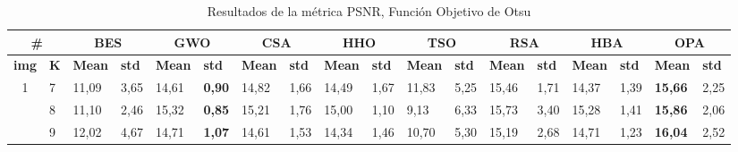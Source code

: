 \documentclass[conference]{IEEEtran}
\begin{document}
\begin{table}[]
	\caption{Resultados de la métrica PSNR, Función Objetivo de Otsu}
	\begin{tabular}{|cl|ll|ll|ll|ll|ll|ll|ll|ll|}
		\hline
		\multicolumn{2}{|c|}{\textbf{\#}} & \multicolumn{2}{c|}{\textbf{BES}} & \multicolumn{2}{c|}{\textbf{GWO}} & \multicolumn{2}{c|}{\textbf{CSA}} & \multicolumn{2}{c|}{\textbf{HHO}} & \multicolumn{2}{c|}{\textbf{TSO}} & \multicolumn{2}{c|}{\textbf{RSA}} & \multicolumn{2}{c|}{\textbf{HBA}} & \multicolumn{2}{c|}{\textbf{OPA}} \\ \hline
		\multicolumn{1}{|l|}{\textbf{img}}        & \textbf{K} & \multicolumn{1}{l|}{\textbf{Mean}} & \textbf{std}  & \multicolumn{1}{l|}{\textbf{Mean}}  & \textbf{std}  & \multicolumn{1}{l|}{\textbf{Mean}}  & \textbf{std}  & \multicolumn{1}{l|}{\textbf{Mean}} & \textbf{std}  & \multicolumn{1}{l|}{\textbf{Mean}}        & \textbf{std} & \multicolumn{1}{l|}{\textbf{Mean}}  & \textbf{std} & \multicolumn{1}{l|}{\textbf{Mean}}  & \textbf{std}  & \multicolumn{1}{l|}{\textbf{Mean}}  & \textbf{std} \\ \hline
		\multicolumn{1}{|c|}{\multirow{3}{*}{1}}  & 7          & \multicolumn{1}{l|}{11,09}         & 3,65          & \multicolumn{1}{l|}{14,61}          & \textbf{0,90} & \multicolumn{1}{l|}{14,82}          & 1,66          & \multicolumn{1}{l|}{14,49}         & 1,67          & \multicolumn{1}{l|}{11,83}                & 5,25 & \multicolumn{1}{l|}{15,46}          & 1,71 & \multicolumn{1}{l|}{14,37}          & 1,39          & \multicolumn{1}{l|}{\textbf{15,66}} & 2,25 \\ \cline{2-18} 
		\multicolumn{1}{|c|}{}                    & 8          & \multicolumn{1}{l|}{11,10}         & 2,46          & \multicolumn{1}{l|}{15,32}          & \textbf{0,85} & \multicolumn{1}{l|}{15,21}          & 1,76          & \multicolumn{1}{l|}{15,00}         & 1,10          & \multicolumn{1}{l|}{9,13}                 & 6,33 & \multicolumn{1}{l|}{15,73}          & 3,40 & \multicolumn{1}{l|}{15,28}          & 1,41          & \multicolumn{1}{l|}{\textbf{15,86}} & 2,06 \\ \cline{2-18} 
		\multicolumn{1}{|c|}{}                    & 9          & \multicolumn{1}{l|}{12,02}         & 4,67          & \multicolumn{1}{l|}{14,71}          & \textbf{1,07} & \multicolumn{1}{l|}{14,61}          & 1,53          & \multicolumn{1}{l|}{14,34}         & 1,46          & \multicolumn{1}{l|}{10,70}                & 5,30 & \multicolumn{1}{l|}{15,19}          & 2,68 & \multicolumn{1}{l|}{14,71}          & 1,23          & \multicolumn{1}{l|}{\textbf{16,04}} & 2,52 \\ \hline

\end{tabular}
\end{table}
\end{document}
